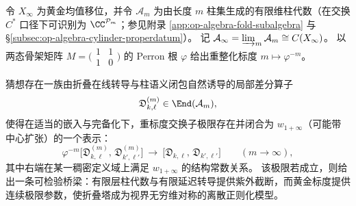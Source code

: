 \begin{conjecture}\label{conj:discussion-fold-tower-w1infty-discretization}
令 \(X_\infty\) 为黄金均值移位，并令 \(\mathcal A_m\) 为由长度 \(m\) 柱集生成的有限维柱代数（在交换 \(C^\ast\) 口径下可识别为 \(\CC^{\mathcal P_m}\)；参见附录 \ref{app:op-algebra-fold-subalgebra} 与 \S\ref{subsec:op-algebra-cylinder-properdatum}）。
记 \(\mathcal A_\infty=\varinjlim_m \mathcal A_m\cong C(X_\infty)\)。
以两态骨架矩阵 \(M=\bigl(\begin{smallmatrix}1&1\\[2pt]1&0\end{smallmatrix}\bigr)\) 的 Perron 根 \(\varphi\) 给出重整化标度 \(m\mapsto \varphi^{-m}\)。
\par
猜想存在一族由折叠在线转导与柱语义闭包自然诱导的局部差分算子
\[
\mathfrak D^{(m)}_{k,\ell}\in \End(\mathcal A_m),
\]
使得在适当的嵌入与完备化下，重标度交换子极限存在并闭合为 \(w_{1+\infty}\)（可能带中心扩张）的一个表示：
\[
\varphi^{-m}\bigl[\mathfrak D^{(m)}_{k,\ell},\,\mathfrak D^{(m)}_{k',\ell'}\bigr]
\ \longrightarrow\
\bigl[\mathfrak D_{k,\ell},\,\mathfrak D_{k',\ell'}\bigr]
\qquad(m\to\infty),
\]
其中右端在某一稠密定义域上满足 \(w_{1+\infty}\) 的结构常数关系。
该极限若成立，则给出一条可检验桥梁：有限层柱代数与有限延迟转导提供紫外截断，而黄金标度提供连续极限参数，使折叠塔成为视界无穷维对称的离散正则化模型。
\end{conjecture}

